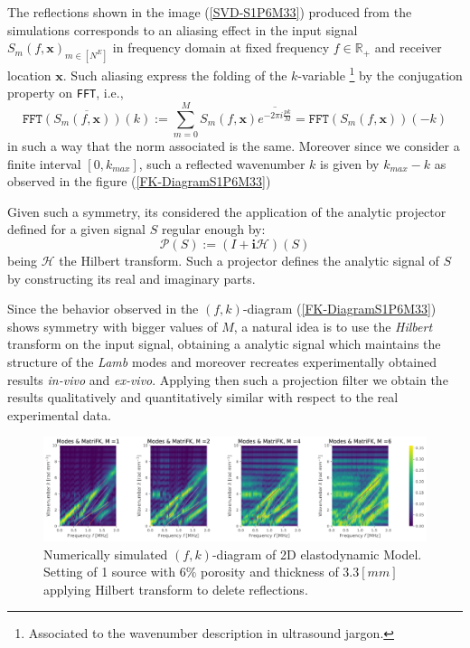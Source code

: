 The reflections shown in the image (\ref{SVD-S1P6M33}) produced from the simulations corresponds to an aliasing effect in the input signal $S_m(f, \mathbf{x})_{m \in [N^E]}$ in frequency domain at fixed frequency $f \in \mathbb{R}_+$ and receiver location $\mathbf{x}$. Such aliasing express the folding of the $k$-variable \footnote{Associated to the wavenumber description in ultrasound jargon.} by the conjugation property on \texttt{FFT}, i.e., 
\begin{equation*}
    \overline{\texttt{FFT}(S_m(f, \mathbf{x}))(k)} := \sum_{m=0}^M S_m(f, \mathbf{x}) \overline{e^{-2 \pi i \frac{p k}{M}}} = \texttt{FFT}(S_m(f, \mathbf{x}))(-k)
\end{equation*}
in such a way that the norm associated is the same. Moreover since we consider a finite interval $[0, k_{max}]$, such a reflected wavenumber $k$ is given by $k_{max}-k$ as observed in the figure (\ref{FK-DiagramS1P6M33})

Given such a symmetry, its considered the application of the analytic projector defined for a given signal $S$ regular enough by:
\begin{equation*}
    \mathcal{P}(S) := (I + \mathbf{i}\mathcal{H})(S)
\end{equation*}
being $\mathcal{H}$ the Hilbert transform. Such a projector defines the analytic signal of $S$ by constructing its real and imaginary parts.

Since the behavior observed in the $(f,k)$-diagram (\ref{FK-DiagramS1P6M33}) shows symmetry with bigger values of $M$, a natural idea is to use the \textit{Hilbert} transform on the input signal, obtaining a analytic signal which maintains the structure of the \textit{Lamb} modes and moreover recreates experimentally obtained results \textit{in-vivo} and \textit{ex-vivo}.
Applying then such a projection filter we obtain the results qualitatively and quantitatively similar with respect to the real experimental data.

\begin{figure}[!h]
	\centering
	\includegraphics[width=\textwidth]{images/TimeSingSous/2DTimeHilb_P6ElasticFK33M1460_y.pdf}
	\caption{Numerically simulated $(f,k)$-diagram of 2D elastodynamic Model. Setting of 1 source with $6\%$ porosity and thickness of $3.3 [mm]$ applying Hilbert transform to delete reflections.}
	\label{FK-Hil-DiagramS1P6M33}
\end{figure} 

